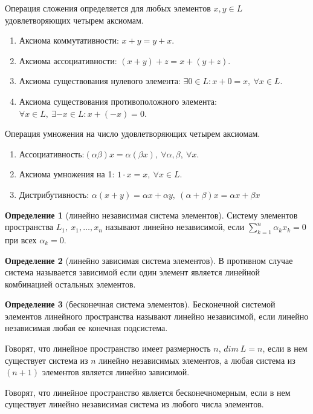 \documentclass[14pt,a4paper]{extarticle}
\theoremstyle{definition}
\newtheorem{definition}{Определение}[section]
\theoremstyle{remark}
\renewcommand{\[}{\begin{dmath*}[compact]}
\renewcommand{\]}{\end{dmath*}}
\newcommand{\be}{\begin{enumerate}}
\newcommand{\ee}{\end{enumerate}}
\newcommand{\ds}{\displaystyle}
\newcommand{\sep}{ , \ \allowbreak }
\begin{document}
Операция сложения определяется для любых элементов $x,y \in L$
удовлетворяющих четырем аксиомам.

\be
  \item Аксиома коммутативности: $x+y = y+x$.

  \item Аксиома ассоциативности: $(x+y)+z = x+(y+z)$.

  \item Аксиома существования нулевого элемента:
  $\exists 0 \in L: x+0=x \sep \forall x \in L$.

  \item Аксиома существования противоположного элемента:
  $\forall x \in L \sep \exists -x \in L: x+(-x)=0$.
\ee

Операция умножения на число удовлетворяющих четырем аксиомам.
\be
  \item Ассоциативность:$(\alpha \beta) x = \alpha (\beta x) \sep
  \forall \alpha, \beta \sep \forall x$.

  \item Аксиома умножения на 1: $1\cdot x = x \sep \forall x \in L$.

  \item Дистрибутивность: $\alpha (x+y)=\alpha x + \alpha y \sep
  (\alpha + \beta) x = \alpha x + \beta x$
\ee

\begin{definition}[линейно независимая система элементов]
  Систему элементов пространства $L_1 \sep x_1, \dots, x_n$ называют
  линейно независимой, если $\ds\sum_{k=1}^n \alpha_k x_k = 0$
  при всех $\alpha_k = 0$.
\end{definition}
\begin{definition}[линейно зависимая система элементов]
  В противном случае система называется зависимой если один элемент
  является линейной комбинацией остальных элементов.
\end{definition}

\begin{definition}[бесконечная система элементов]
  Бесконечной системой элементов линейного пространства называют
  линейно независимой, если линейно независимая любая ее конечная подсистема.
\end{definition}

Говорят, что линейное пространство имеет размерность $n$, $dim\ L=n$,
если в нем существует система из $n$ линейно независимых элементов,
а любая система из $(n+1)$ элементов является линейно зависимой.

Говорят, что линейное пространство является бесконечномерным,
если в нем существует линейно независимая система из любого числа элементов.
\end{document}
